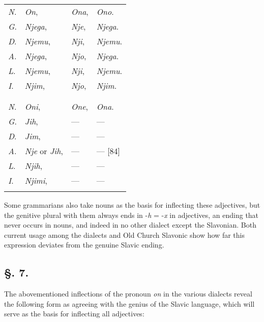 \begin{longtable}{ l l l l }
    \lsptoprule
    \multicolumn{4}{ c }{Singular.} \\
    \midrule
    \textit{N}. & \textit{On}, & \textit{Ona}, & \textit{Ono}. \\
    \textit{G}. & \textit{Njega}, & \textit{Nje}, & \textit{Njega}. \\
    \textit{D}. & \textit{Njemu}, & \textit{Nji}, & \textit{Njemu}. \\
    \textit{A}. & \textit{Njega}, & \textit{Njo}, & \textit{Njega}. \\
    \textit{L}. & \textit{Njemu}, & \textit{Nji}, & \textit{Njemu}. \\
    \textit{I}. & \textit{Njim}, & \textit{Njo}, & \textit{Njim}. \\
    \lspbottomrule
    \\
    \lsptoprule
    \multicolumn{4}{ c }{Plural.} \\
    \midrule
    \textit{N}. & \textit{Oni}, & \textit{One}, & \textit{Ona}. \\
    \textit{G}. & \textit{Jih}, & — & — \\
    \textit{D}. & \textit{Jim}, & — & — \\
    \textit{A}. & \textit{Nje} or \textit{Jih}, & — & — [84] \\
    \textit{L}. & \textit{Njih}, & — & — \\
    \textit{I}. & \textit{Njimi}, & — & — \\
    \lspbottomrule
\end{longtable}

Some grammarians also take nouns as the basis for inflecting these adjectives, but the genitive plural with them always ends in -\textit{h} = -\textit{x} in adjectives, an ending that never occurs in nouns, and indeed in no other dialect except the Slavonian. Both current usage among the dialects and Old Church Slavonic show how far this expression deviates from the genuine Slavic ending.

\subsection*{\hspace*{\fill}§. 7.\hspace*{\fill}}

The abovementioned inflections of the pronoun \textit{on} in the various dialects reveal the following form as agreeing with the genius of the Slavic language, which will serve as the basis for inflecting all adjectives:

